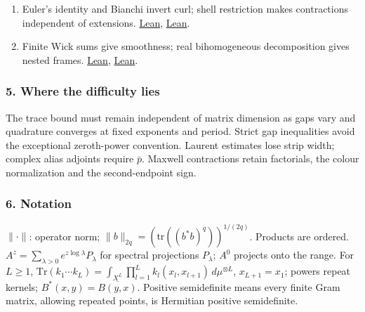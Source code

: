 \documentclass[
  letterpaper,
  11pt]{article}
\begin{document}
\begin{enumerate}
  roots; Banach-algebra convergence gives holomorphy.
  \href{https://github.com/yang-mills-group/OpenAI-YM-20261028/blob/3456e5e75cf8d4cd558955a5c7638fba2d68f464/YM/Work/F07/MatrixRoot.lean\#L185-L198}{\texttt{binRoot\_on\_band}}.
\item
  Euler's identity and Bianchi invert curl; shell restriction makes
  contractions independent of extensions.
  \href{https://github.com/yang-mills-group/OpenAI-YM-20261028/blob/3456e5e75cf8d4cd558955a5c7638fba2d68f464/YM/Maxwell/Exterior.lean\#L163-L195}{Lean},
  \href{https://github.com/yang-mills-group/OpenAI-YM-20261028/blob/3456e5e75cf8d4cd558955a5c7638fba2d68f464/YM/Maxwell/Leg.lean\#L148-L159}{Lean}.
\item
  Finite Wick sums give smoothness; real bihomogeneous decomposition
  gives nested frames.
  \href{https://github.com/yang-mills-group/OpenAI-YM-20261028/blob/3456e5e75cf8d4cd558955a5c7638fba2d68f464/YM/Maxwell/Wick.lean\#L152-L154}{Lean},
  \href{https://github.com/yang-mills-group/OpenAI-YM-20261028/blob/3456e5e75cf8d4cd558955a5c7638fba2d68f464/YM/Labels/Basis.lean\#L107-L111}{Lean}.
\end{enumerate}

\subsubsection{5. Where the difficulty
lies}\label{where-the-difficulty-lies-18}

The trace bound must remain independent of matrix dimension as gaps vary
and quadrature converges at fixed exponents and period. Strict gap
inequalities avoid the exceptional zeroth-power convention. Laurent
estimates lose strip width; complex alias adjoints require \(\bar p\).
Maxwell contractions retain factorials, the colour normalization and the
second-endpoint sign.

\subsubsection{6. Notation}\label{notation-18}

\(\|\cdot\|\): operator norm;
\(\|b\|_{2q}=(\mathrm{tr}((b^*b)^q))^{1/(2q)}\). Products are ordered.
\(A^z=\sum_{\lambda>0}e^{z\log\lambda}P_\lambda\) for spectral
projections \(P_\lambda\); \(A^0\) projects onto the range. For
\(L\ge1\),
\(\mathrm{Tr}(k_1\cdots k_L)=\int_{X^L}\prod_{l=1}^Lk_l(x_l,x_{l+1})\,d\mu^{\otimes L}\),
\(x_{L+1}=x_1\); powers repeat kernels; \(B^*(x,y)=\overline{B(y,x)}\).
Positive semidefinite means every finite Gram matrix, allowing repeated
points, is Hermitian positive semidefinite.
\end{document}
